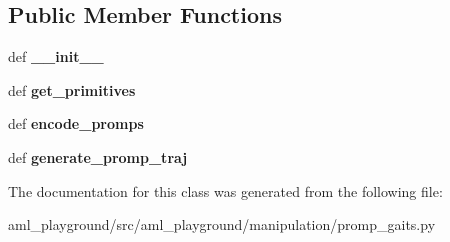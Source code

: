 \subsection*{Public Member Functions}
\begin{DoxyCompactItemize}
\item 
\hypertarget{classaml__playground_1_1manipulation_1_1promp__gaits_1_1_p_r_o_m_p_gaits_a5cd1b53d3b5a3ca27052e658c664fa1a}{def {\bfseries \-\_\-\-\_\-init\-\_\-\-\_\-}}\label{classaml__playground_1_1manipulation_1_1promp__gaits_1_1_p_r_o_m_p_gaits_a5cd1b53d3b5a3ca27052e658c664fa1a}

\item 
\hypertarget{classaml__playground_1_1manipulation_1_1promp__gaits_1_1_p_r_o_m_p_gaits_a638b87c2d3fe046cd9bcf5d186477d9f}{def {\bfseries get\-\_\-primitives}}\label{classaml__playground_1_1manipulation_1_1promp__gaits_1_1_p_r_o_m_p_gaits_a638b87c2d3fe046cd9bcf5d186477d9f}

\item 
\hypertarget{classaml__playground_1_1manipulation_1_1promp__gaits_1_1_p_r_o_m_p_gaits_a40c92a3dabadc99273e3424771f93a9f}{def {\bfseries encode\-\_\-promps}}\label{classaml__playground_1_1manipulation_1_1promp__gaits_1_1_p_r_o_m_p_gaits_a40c92a3dabadc99273e3424771f93a9f}

\item 
\hypertarget{classaml__playground_1_1manipulation_1_1promp__gaits_1_1_p_r_o_m_p_gaits_ac9094aaf780dcc8f5a3fc9e508037fd6}{def {\bfseries generate\-\_\-promp\-\_\-traj}}\label{classaml__playground_1_1manipulation_1_1promp__gaits_1_1_p_r_o_m_p_gaits_ac9094aaf780dcc8f5a3fc9e508037fd6}

\end{DoxyCompactItemize}


The documentation for this class was generated from the following file\-:\begin{DoxyCompactItemize}
\item 
aml\-\_\-playground/src/aml\-\_\-playground/manipulation/promp\-\_\-gaits.\-py\end{DoxyCompactItemize}
